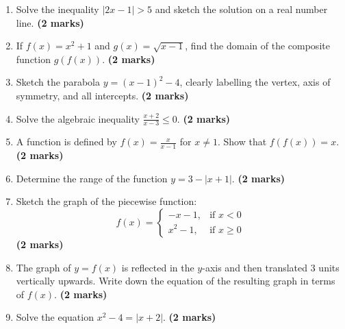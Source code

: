 \documentclass[11pt,a4paper]{article}
\begin{document}
\begin{enumerate}
    \item Solve the inequality $|2x - 1| > 5$ and sketch the solution on a real number line. \hfill \textbf{(2 marks)}
    \vspace{0.5cm}

    \item If $f(x) = x^2 + 1$ and $g(x) = \sqrt{x - 1}$, find the domain of the composite function $g(f(x))$. \hfill \textbf{(2 marks)}
    \vspace{0.5cm}

    \item Sketch the parabola $y = (x-1)^2 - 4$, clearly labelling the vertex, axis of symmetry, and all intercepts. \hfill \textbf{(2 marks)}
    \vspace{0.5cm}

    \item Solve the algebraic inequality $\frac{x+2}{x-3} \le 0$. \hfill \textbf{(2 marks)}
    \vspace{0.5cm}

    \item A function is defined by $f(x) = \frac{x}{x-1}$ for $x \neq 1$. Show that $f(f(x)) = x$. \hfill \textbf{(2 marks)}
    \vspace{0.5cm}

    \item Determine the range of the function $y = 3 - |x + 1|$. \hfill \textbf{(2 marks)}
    \vspace{0.5cm}

    \item Sketch the graph of the piecewise function:
    \begin{equation*}
    f(x) = \begin{cases} -x - 1, & \text{if } x < 0 \\ x^2 - 1, & \text{if } x \ge 0 \end{cases}
    \end{equation*} \hfill \textbf{(2 marks)}
    \vspace{0.5cm}

    \item The graph of $y = f(x)$ is reflected in the $y$-axis and then translated 3 units vertically upwards. Write down the equation of the resulting graph in terms of $f(x)$. \hfill \textbf{(2 marks)}
    \vspace{0.5cm}

    \item Solve the equation $x^2 - 4 = |x + 2|$. \hfill \textbf{(2 marks)}
    \vspace{0.5cm}


\end{enumerate}
\end{document}
